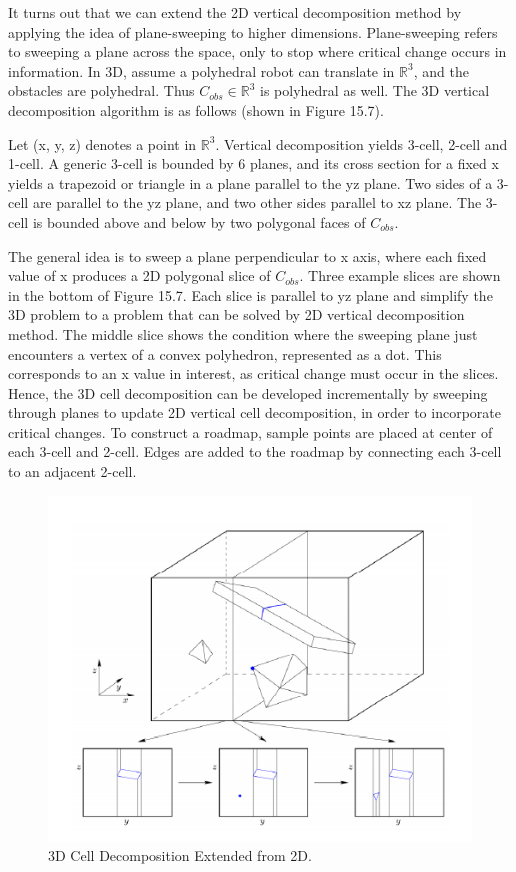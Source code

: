 \documentclass[twoside]{article}
\begin{document}
It turns out that we can extend the 2D vertical decomposition method by applying the idea of plane-sweeping to higher dimensions. Plane-sweeping refers to sweeping a plane across the space, only to stop where critical change occurs in information. In 3D, assume a polyhedral robot can translate in $\mathbb{R}^3$, and the obstacles are polyhedral. Thus $C_{obs} \in \mathbb{R}^3$ is polyhedral as well. The 3D vertical decomposition algorithm is as follows (shown in Figure 15.7).

Let (x, y, z) denotes a point in $\mathbb{R}^3$. Vertical decomposition yields 3-cell, 2-cell and 1-cell. A generic 3-cell is bounded by 6 planes, and its cross section for a fixed x yields a trapezoid or triangle in a plane parallel to the yz plane. Two sides of a 3-cell are parallel to the yz plane, and two other sides parallel to xz plane. The 3-cell is bounded above and below by two polygonal faces of $C_{obs}$.

The general idea is to sweep a plane perpendicular to x axis, where each fixed value of x produces a 2D polygonal slice of $C_{obs}$. Three example slices are shown in the bottom of Figure 15.7. Each slice is parallel to yz plane and simplify the 3D problem to a problem that can be solved by 2D vertical decomposition method. The middle slice shows the condition where the sweeping plane just encounters a vertex of a convex polyhedron, represented as a dot. This corresponds to an x value in interest, as critical change
must occur in the slices. Hence, the 3D cell decomposition can be developed incrementally by sweeping through planes to update 2D vertical cell decomposition, in order to incorporate critical changes. To construct a roadmap, sample points are placed at center of each 3-cell and 2-cell. Edges are added to the roadmap by connecting each 3-cell to an adjacent 2-cell.

\begin{figure}[H]
\begin{center}
\includegraphics{fig15_7.PNG}
\caption{3D Cell Decomposition Extended from 2D.}
\end{center}
\end{figure}
\end{document}
